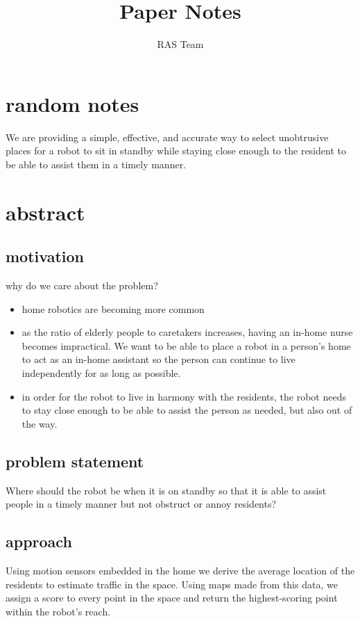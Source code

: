 \documentclass[11pt, conference, a4paper]{IEEEtran}
\author{RAS Team}
\title{Paper Notes}
\begin{document}
\maketitle

\section{random notes}

We are providing a simple, effective, and accurate way to select unobtrusive 
places for a robot to sit in standby while staying close enough to the resident to be able to assist them in a timely manner.


\section{abstract}

\subsection{motivation}
why do we care about the problem?
\begin{itemize}
    \item home robotics are becoming more common
    \item as the ratio of elderly people to caretakers increases, having an 
        in-home nurse becomes impractical. We want to be able to place a robot 
        in a person's home to act as an in-home assistant so the person can continue to live 
        independently for as long as possible.
    \item in order for the robot to live in harmony with the residents, the robot needs 
        to stay close enough to be able to assist the person as 
        needed, but also out of the way.
\end{itemize}

\subsection{problem statement}
Where should the robot be when it is on standby so that it is able to assist people in a timely manner but not obstruct or annoy residents? 

\subsection{approach}
Using motion sensors embedded in the home we derive the average location of the 
residents to estimate traffic in the space. Using maps made from this data, we assign a score to every point in the space and return the highest-scoring point within the robot's reach. 
\end{document}
